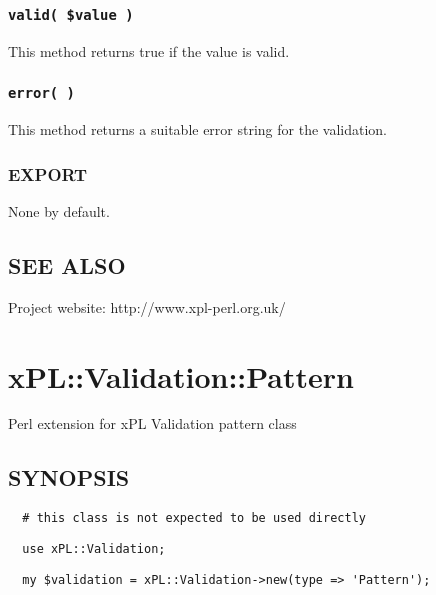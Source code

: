 \subsubsection*{\texttt{valid( \$value )}\label{xPL::Validation::IP_valid_value_}}


This method returns true if the value is valid.

\subsubsection*{\texttt{error( )}\label{xPL::Validation::IP_error_}}


This method returns a suitable error string for the validation.

\subsubsection*{EXPORT\label{xPL::Validation::IP_EXPORT}}


None by default.

\subsection*{SEE ALSO\label{xPL::Validation::IP_SEE_ALSO}}


Project website: http://www.xpl-perl.org.uk/

\section{xPL::Validation::Pattern\label{xPL::Validation::Pattern}}


Perl extension for xPL Validation pattern class

\subsection*{SYNOPSIS\label{xPL::Validation::Pattern_SYNOPSIS}}
\begin{verbatim}
  # this class is not expected to be used directly
\end{verbatim}
\begin{verbatim}
  use xPL::Validation;
\end{verbatim}
\begin{verbatim}
  my $validation = xPL::Validation->new(type => 'Pattern');
\end{verbatim}
